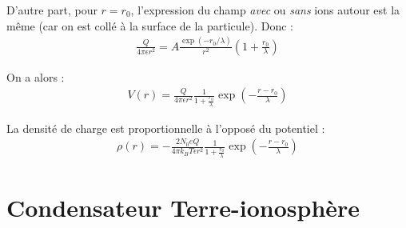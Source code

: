 \documentclass{report}
\begin{document}
\begin{itemize}
	D'autre part, pour $r=r_0$, l'expression du champ \textit{avec} ou \textit{sans} ions autour est la même (car on est collé à la surface de la particule). Donc :
	\begin{align*}
		\frac{Q}{4\pi\epsilon r^2}=A\frac{\exp(-r_0/\lambda)}{r^2}\left(1+\frac{r_0}{\lambda}\right)
	\end{align*}
	
	On a alors :
	\begin{align*}
		V(r)=\frac{Q}{4\pi\epsilon r^2}\frac{1}{1+\frac{r_0}{\lambda}}\exp\left(-\frac{r-r_0}{\lambda} \right) 
	\end{align*}
	
La densité de charge est proportionnelle à l'opposé du potentiel :
	\begin{align*}
		\rho(r)=-\frac{2N_0eQ}{4\pi k_BT\epsilon r^2}\frac{1}{1+\frac{r_0}{\lambda}}\exp\left(-\frac{r-r_0}{\lambda} \right) 
	\end{align*}	
	
\end{itemize}

\section*{Condensateur Terre-ionosphère}
\end{document}
